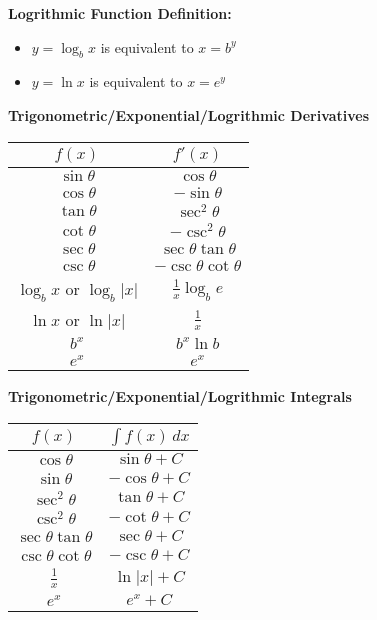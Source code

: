 \documentclass[12pt]{exam}
\newcommand{\<}{\langle}
\renewcommand{\>}{\rangle}
\begin{document}
\noindent
\textbf{Logrithmic Function Definition:}
\begin{itemize}
  \item \(y=\log_b x\) is equivalent to \(x=b^y\)
  \item \(y=\ln x\) is equivalent to \(x=e^y\)
\end{itemize}

\newpage

\noindent
\textbf{Trigonometric/Exponential/Logrithmic Derivatives}

\begin{center}
\begin{tabular}{c|c}
  \(f(x)\) & \(f'(x)\) \\\hline
  \(\sin\theta\) & \(\cos\theta\) \\
  \(\cos\theta\) & \(-\sin\theta\) \\
  \(\tan\theta\) & \(\sec^2\theta\) \\
  \(\cot\theta\) & \(-\csc^2\theta\) \\
  \(\sec\theta\) & \(\sec\theta\tan\theta\) \\
  \(\csc\theta\) & \(-\csc\theta\cot\theta\) \\
  \(\log_b x\) or \(\log_b|x|\) & \(\frac{1}{x}\log_b e\) \\
  \(\ln x\) or \(\ln|x|\) & \(\frac{1}{x}\) \\
  \(b^x\) & \(b^x\ln b\) \\
  \(e^x\) & \(e^x\)
\end{tabular}
\end{center}

\noindent
\textbf{Trigonometric/Exponential/Logrithmic Integrals}

\begin{center}
\begin{tabular}{c|c}
  \(f(x)\) & \(\int f(x)\,dx\) \\\hline
  \(\cos\theta\) & \(\sin\theta+C\) \\
  \(\sin\theta\) & \(-\cos\theta+C\) \\
  \(\sec^2\theta\) & \(\tan\theta+C\) \\
  \(\csc^2\theta\) & \(-\cot\theta+C\) \\
  \(\sec\theta\tan\theta\) & \(\sec\theta+C\) \\
  \(\csc\theta\cot\theta\) & \(-\csc\theta+C\) \\
  \(\frac{1}{x}\) & \(\ln|x|+C\) \\
  \(e^x\) & \(e^x+C\)
\end{tabular}
\end{center}
\end{document}
